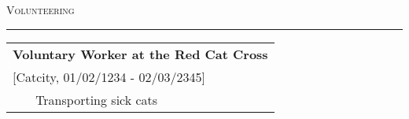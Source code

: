 \documentclass[
	fontsize = 10.0pt,
	a4paper,
	parskip = half*,
	twoside,	%
]{scrartcl}
\renewcommand{\arraystretch}{1.5}			%
\begin{document}
	\vspace{5mm}

	{\fontsize{20pt}{17pt}\selectfont\scshape Volunteering}
	\vskip 1mm%
	{\color{black!25}\hrule}

	\renewcommand{\arraystretch}{1.25}			%
	\begin{table}[H]
		\begin{tabularx}{\textwidth}{l X}
			\multicolumn{2}{l}{{\fontsize{14pt}{10pt}\selectfont\bfseries Voluntary Worker at the Red Cat Cross}}	\\
			\multicolumn{2}{l}{[Catcity, 01/02/1234 - 02/03/2345]}	\\
			\hspace{1.5mm} & Transporting sick cats\\
		\end{tabularx}
	\end{table}
\end{document}

